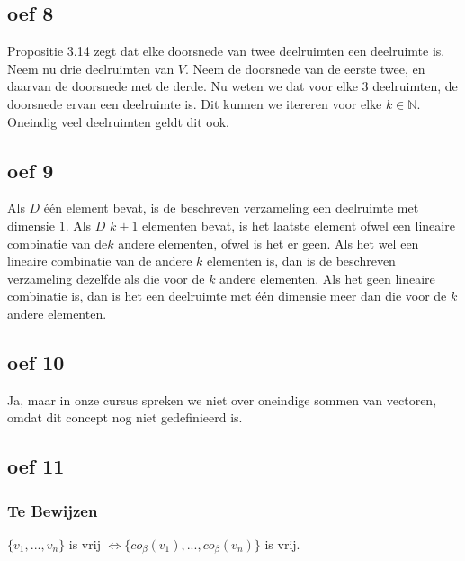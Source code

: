 \documentclass[lineaire_algebra_oplossingen.tex]{subfiles}
\begin{document}
\subsection{oef 8}
Propositie 3.14 zegt dat elke doorsnede van twee deelruimten een deelruimte is. Neem nu drie deelruimten van $V$. Neem de doorsnede van de eerste twee, en daarvan de doorsnede met de derde. Nu weten we dat voor elke $3$ deelruimten, de doorsnede ervan een deelruimte is. Dit kunnen we itereren voor elke $k \in \mathbb{N}$. Oneindig veel deelruimten geldt dit ook.

\subsection{oef 9}
Als $D$ één element bevat, is de beschreven verzameling een deelruimte met dimensie $1$. Als $D$ $k+1$ elementen bevat, is het laatste element ofwel een lineaire combinatie van de$k$ andere elementen, ofwel is het er geen. Als het wel een lineaire combinatie van de andere $k$ elementen is, dan is de beschreven verzameling dezelfde als die voor de $k$ andere elementen. Als het geen lineaire combinatie is, dan is het een deelruimte met één dimensie meer dan die voor de $k$ andere elementen.

\subsection{oef 10}
Ja, maar in onze cursus spreken we niet over oneindige sommen van vectoren, omdat dit concept nog niet gedefinieerd is.

\subsection{oef 11}
\subsubsection*{Te Bewijzen}
$\{v_1,...,v_n\}$ is vrij $\Leftrightarrow \{co_{\beta}(v_1),...,co_{\beta}(v_n)\}$ is vrij.
\end{document}
